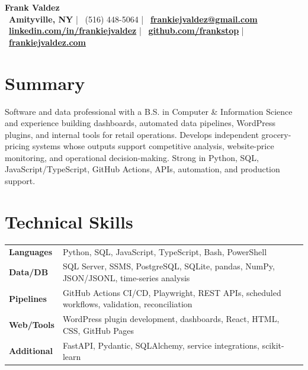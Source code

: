 \documentclass[10pt,letterpaper]{article}
\newcommand{\resumeTitle}[1]{{\fontsize{9.65}{11.35}\selectfont\textbf{#1}}}
\begin{document}
\fontsize{9.25}{11.05}\selectfont

\begin{center}
  {\fontsize{24}{26}\selectfont \textbf{Frank Valdez}}\\[2pt]
  \faMapMarker*~\textbf{Amityville, NY} \quad | \quad \faPhone*~(516) 448-5064 \quad | \quad \faEnvelope~\href{mailto:frankiejvaldez@gmail.com}{\textbf{frankiejvaldez@gmail.com}}\\[1.5pt]
  \faLinkedin~\href{https://linkedin.com/in/frankiejvaldez}{\textbf{linkedin.com/in/frankiejvaldez}} \quad | \quad \faGithub~\href{https://github.com/frankstop}{\textbf{github.com/frankstop}} \quad | \quad \faGlobe~\href{https://frankiejvaldez.com}{\textbf{frankiejvaldez.com}}
\end{center}

\section*{Summary}
Software and data professional with a B.S. in Computer \& Information Science and experience building dashboards, automated data pipelines, WordPress plugins, and internal tools for retail operations. Develops independent grocery-pricing systems whose outputs support competitive analysis, website-price monitoring, and operational decision-making. Strong in Python, SQL, JavaScript/TypeScript, GitHub Actions, APIs, automation, and production support.

\section*{Technical Skills}
\begin{tabularx}{\textwidth}{@{}p{1.15in} >{\raggedright\arraybackslash}X@{}}
\resumeTitle{Languages} & Python, SQL, JavaScript, TypeScript, Bash, PowerShell\\
\resumeTitle{Data/DB} & SQL Server, SSMS, PostgreSQL, SQLite, pandas, NumPy, JSON/JSONL, time-series analysis\\
\resumeTitle{Pipelines} & GitHub Actions CI/CD, Playwright, REST APIs, scheduled workflows, validation, reconciliation\\
\resumeTitle{Web/Tools} & WordPress plugin development, dashboards, React, HTML, CSS, GitHub Pages\\
\resumeTitle{Additional} & FastAPI, Pydantic, SQLAlchemy, service integrations, scikit-learn\\
\end{tabularx}
\end{document}
